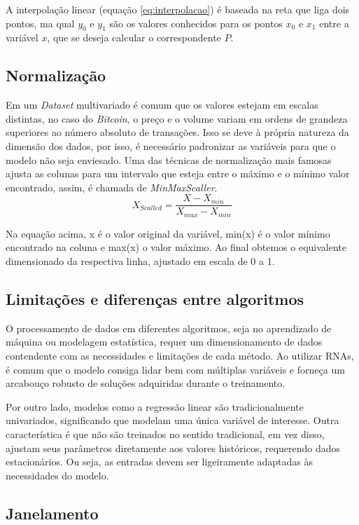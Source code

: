 A interpolação linear (equação \ref{eq:interpolacao}) é baseada na reta que liga dois pontos, ma qual \(y_0\) e \(y_1\) são os valores conhecidos para os pontos
\(x_0\) e \(x_1\) entre a variável \(x\), que se deseja calcular o correspondente \(P\).

\subsection{Normalização} \label{sec:normalizar}
Em um \textit{Dataset} multivariado é comum que os valores estejam em escalas distintas, no caso do \textit{Bitcoin}, o preço e o volume variam em ordens de grandeza superiores ao número absoluto de transações.
Isso se deve à própria natureza da dimensão dos dados, por isso, é necessário padronizar as variáveis para que o modelo não seja enviesado.
Uma das técnicas de normalização mais famosas ajusta as colunas para um intervalo que esteja entre o máximo e o mínimo valor encontrado, assim,  é chamada de \textit{MinMaxScaller}.
\begin{equation}
    {X_{Scalled} = \frac{X-X_{min}}{X_{max}-X_{min}}}
    \label{eq:scalled}
\end{equation}

Na equação acima, x é o valor original da variável, min(x) é o valor mínimo encontrado na coluna e max(x) o valor máximo.
Ao final obtemos o equivalente dimensionado da respectiva linha, ajustado em escala de 0 a 1.

\subsection{Limitações e diferenças entre algoritmos} \label{sec:limitacao}
O processamento de dados em diferentes algoritmos, seja no aprendizado de máquina ou modelagem estatística, requer um dimensionamento de dados contendente com as necessidades e limitações de cada método.
Ao utilizar RNAs, é comum que o modelo consiga lidar bem com múltiplas variáveis e forneça um arcabouço robusto de soluções adquiridas durante o treinamento.

Por outro lado, modelos como a regressão linear são tradicionalmente univariados, significando que modelam uma única variável de interesse.
Outra característica é que não são treinados no sentido tradicional, em vez disso, ajustam seus parâmetros diretamente aos valores históricos, requerendo dados estacionários.
Ou seja, as entradas devem ser ligeiramente adaptadas às necessidades do modelo.

\subsection{Janelamento} \label{sec:janelamento}

